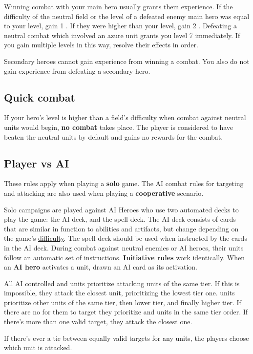 \documentclass[12pt]{article}
\def\assets{assets}
\def\svgs{\assets/svgs}
\begin{document}
Winning combat with your main hero usually grants them experience. If the difficulty of the neutral field or the level of a defeated enemy main hero was equal to your level, gain 1 . If they were higher than your level, gain 2 . Defeating a neutral combat which involved an azure unit grants you level 7 immediately.
 If you gain multiple levels in this way, resolve their effects in order.\par
Secondary heroes cannot gain experience from winning a combat. You also do not gain experience from defeating a secondary hero.
\subsection*{\hypertarget{Quick}{Quick combat}}
If your hero’s level is higher than a field’s difficulty when combat against neutral units would begin, \textbf{no combat} takes place. The player is considered to have beaten the neutral units by default and gains no rewards for the combat.

\subsection*{\hypertarget{AIrules}{Player vs AI}}
These rules apply when playing a \textbf{solo} game. The AI combat rules for targeting and attacking are also used when playing a \textbf{cooperative} scenario.\par
Solo campaigns are played against AI Heroes who use two automated decks to play the game: the AI deck, and the spell deck. The AI deck consists of cards that are similar in function to abilities and artifacts, but change depending on the game's \hyperlink{Difficulty}{difficulty}. The spell deck should be used
when instructed by the cards in the AI deck. During combat against neutral enemies or AI heroes, their units follow an automatic set of instructions. \textbf{Initiative rules} work identically. When an \textbf{AI hero} activates a unit, drawn an AI card as its activation.\par
All AI controlled  and  units prioritize attacking units of the same tier. If this is impossible, they attack the closest unit, prioritizing the lowest tier one.  units prioritize other  units of the same tier, then lower tier, and finally higher tier. If there are no  for them to target they prioritize  and  units in the same tier order. If there's more than one valid target, they attack the closest one.\par
If there's ever a tie between equally valid targets for any units, the players choose which unit is attacked.
\end{document}
